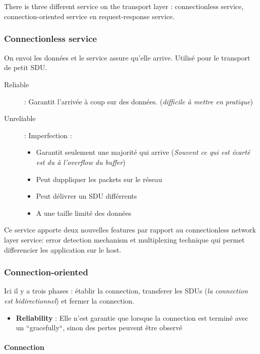 \subparagraph{ }There is three different service on the transport layer : connectionless service,
connection-oriented service en request-response service.

\subsubsection{Connectionless service}
On envoi les données et le service assure qu'elle arrive.
Utilisé pour le transport de petit SDU.

\begin{description}
    \item[Reliable] : Garantit l'arrivée à coup sur des données. (\textit{difficile à mettre en pratique})
    \item[Unreliable] : Imperfection :
        \begin{itemize}
            \item Garantit seulement une majorité qui arrive (\textit{Souvent ce qui est écarté est du à l'overflow du buffer})
            \item Peut duppliquer les packets sur le réseau
            \item Peut délivrer un SDU différrents
            \item A une taille limité des données
        \end{itemize}
\end{description}
 Ce service apporte deux nouvelles features par rapport au connectionless network layer service: error detection mechanism et multiplexing technique qui permet differencier les  application sur le host.

\subsubsection{Connection-oriented}
Ici il y a trois phases : établir la connection, transferer les SDUs (\textit{la connection est
bidirectionnel}) et fermer la connection.

\begin{itemize}
    \item \textbf{Reliability} : Elle n'est garantie que lorsque la connection est terminé avec un ``gracefully``, sinon des pertes peuvent être observé
\end{itemize}

\paragraph{\textbf{Connection}}

